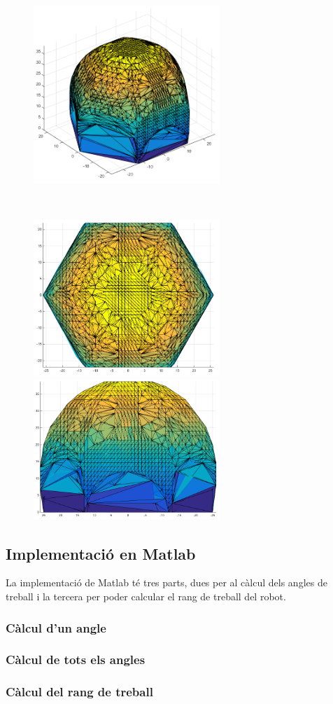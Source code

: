 \begin{figure}[h!]
\centering
\begin{minipage}{7cm}
\centering
\includegraphics[width=7cm]{./images/rangTreball}
\end{minipage}
\\
\hfill
\begin{minipage}{7cm}
\centering
\includegraphics[width=7cm]{./images/rangTreball2}
\end{minipage}
\hfill
\begin{minipage}{7cm}
\centering
\includegraphics[width=7cm]{./images/rangTreball3}
\end{minipage}
\hfill
\end{figure}

\subsection{Implementació en Matlab}

La implementació de Matlab té tres parts, dues per al càlcul dels angles de treball i la tercera per poder calcular el rang de treball del robot.

\subsubsection{Càlcul d'un angle}

\subsubsection{Càlcul de tots els angles}

\subsubsection{Càlcul del rang de treball}
